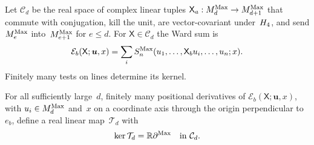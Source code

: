 Let $\mathcal C_d$ be the real space of complex linear tuples $\mathsf X_a:M_{d}^{\mathrm{Max}}\to M_{d+1}^{\mathrm{Max}}$ that commute with conjugation, kill the unit, are vector-covariant under~$H_4$, and send $M_{e}^{\mathrm{Max}}$ into~$M_{e+1}^{\mathrm{Max}}$ for $e\le d$. For $\mathsf X\in\mathcal C_d$ the Ward sum is
\begin{equation*}
\mathcal E_b(\mathsf X;\boldsymbol u,x)=\sum_i S_n^{\rm Max}(u_1,\ldots,\mathsf X_bu_i,\ldots,u_n;x).
\end{equation*}
Finitely many tests on lines determine its kernel.
\begin{lemma}\label{lem:G1-vector}
For all sufficiently large~$d$, finitely many positional derivatives of $\mathcal E_b(\mathsf X;\boldsymbol u,x)$, with $u_i\in M_{d}^{\mathrm{Max}}$ and~$x$ on a coordinate axis through the origin perpendicular to~$e_b$, define a real linear map~$\mathcal T_d$ with
\begin{equation}\label{eq:G-free-tests}
\ker\mathcal T_d=\mathbb{R}\partial^{\rm Max}\quad\text{in }\mathcal C_d.
\end{equation}
\end{lemma}
